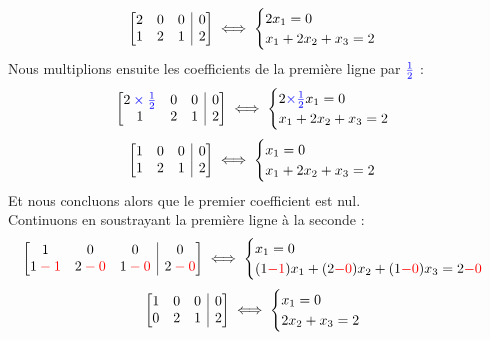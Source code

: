 $$ 
\left[
\begin{array}{@{}ccc|c@{}}
2 & 0 & 0 & 0 \\
1 & 2 & 1 & 2 \\
\end{array}
\right]
\iff
\begin{cases}
2x_1 = 0\\
x_1 + 2x_2 + x_3 = 2
\end{cases}
$$
Nous multiplions ensuite les coefficients de la première ligne par $\color{blue}\frac{1}{2}$ :
$$ 
\left[
\begin{array}{@{}ccc|c@{}}
2 \color{blue}\times\frac{1}{2}  & 0 & 0 & 0 \\
1 & 2 & 1 & 2 \\
\end{array}
\right]
\iff
\begin{cases}
2\textcolor{blue}{\times \frac{1}{2}}x_1 = 0\\
x_1 + 2x_2 + x_3 = 2
\end{cases}
$$
$$ 
\left[
\begin{array}{@{}ccc|c@{}}
1 & 0 & 0 & 0 \\
1 & 2 & 1 & 2 \\
\end{array}
\right]
\iff
\begin{cases}
x_1 = 0 \\
x_1 + 2x_2 + x_3 = 2
\end{cases}
$$
Et nous concluons alors que le premier coefficient est nul.\\
Continuons en soustrayant la première ligne à la seconde :
$$ 
\left[
\begin{array}{@{}ccc|c@{}}
1 & 0 & 0 & 0 \\
1\color{red} - 1 & 2\color{red} - 0 & 1\color{red} - 0 & 2\color{red} - 0 \\
\end{array}
\right]
\iff 
\begin{cases}
x_1 = 0 \\
(1\textcolor{red}{-1})x_1 + (2\textcolor{red}{-0})x_2 + (1\textcolor{red}{-0})x_3 = 2\textcolor{red}{-0}
\end{cases}
$$
$$ 
\left[
\begin{array}{@{}ccc|c@{}}
1 & 0 & 0 & 0 \\
0 & 2 & 1 & 2 \\
\end{array}
\right]
\iff
\begin{cases}
x_1 = 0 \\
2x_2 + x_3 = 2
\end{cases}
$$
